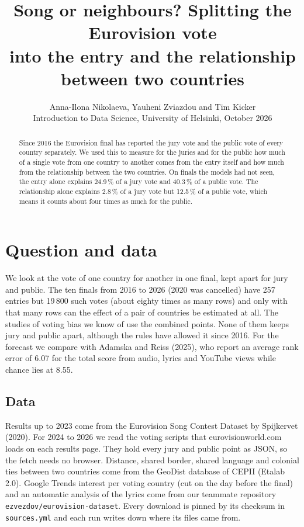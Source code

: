 \documentclass[a4paper,10pt]{article}
\title{\vspace{-1.2cm}\textbf{Song or neighbours? Splitting the Eurovision vote\\ into the entry and the relationship between two countries}}
\author{Anna-Ilona Nikolaeva, Yauheni Zviazdou and Tim Kicker\\
\small Introduction to Data Science, University of Helsinki, October 2026}
\date{}
\begin{document}
\maketitle
\vspace{-1.2em}

\begin{abstract}\small
\noindent
Since 2016 the Eurovision final has reported the jury vote and the public vote of every country separately.
We used this to measure for the juries and for the public how much of a single vote from one country to another comes from the entry itself and how much from the relationship between the two countries.
On finals the models had not seen, the entry alone explains 24.9\,\% of a jury vote and 40.3\,\% of a public vote.
The relationship alone explains 2.8\,\% of a jury vote but 12.5\,\% of a public vote, which means it counts about four times as much for the public.
\end{abstract}

\section{Question and data}

We look at the vote of one country for another in one final, kept apart for jury and public.
The ten finals from 2016 to 2026 (2020 was cancelled) have 257 entries but 19\,800 such votes (about eighty times as many rows) and only with that many rows can the effect of a pair of countries be estimated at all.
The studies of voting bias we know of use the combined points.
None of them keeps jury and public apart, although the rules have allowed it since 2016.
For the forecast we compare with Adamska and Reiss (2025), who report an average rank error of 6.07 for the total score from audio, lyrics and YouTube views while chance lies at 8.55.

\subsection{Data}

Results up to 2023 come from the Eurovision Song Contest Dataset by Spijkervet (2020).
For 2024 to 2026 we read the voting scripts that eurovisionworld.com loads on each results page.
They hold every jury and public point as JSON, so the fetch needs no browser.
Distance, shared border, shared language and colonial ties between two countries come from the GeoDist database of CEPII (Etalab 2.0).
Google Trends interest per voting country (cut on the day before the final) and an automatic analysis of the lyrics come from our teammate repository \texttt{ezvezdov/\allowbreak eurovision-dataset}.
Every download is pinned by its checksum in \texttt{sources.yml} and each run writes down where its files came from.
\end{document}
